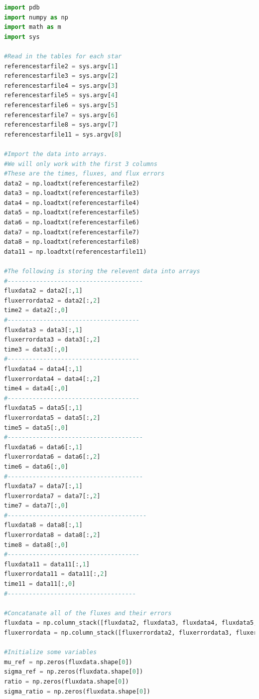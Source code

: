 \documentclass{aastex61}
\begin{document}
\begin{lstlisting}[language = Python, caption = Creates table of values to be used for the final light curve (YM and JM)]
import pdb
import numpy as np
import math as m
import sys

#Read in the tables for each star
referencestarfile2 = sys.argv[1]
referencestarfile3 = sys.argv[2]
referencestarfile4 = sys.argv[3]
referencestarfile5 = sys.argv[4]
referencestarfile6 = sys.argv[5]
referencestarfile7 = sys.argv[6]
referencestarfile8 = sys.argv[7]
referencestarfile11 = sys.argv[8]

#Import the data into arrays.
#We will only work with the first 3 columns
#These are the times, fluxes, and flux errors
data2 = np.loadtxt(referencestarfile2)
data3 = np.loadtxt(referencestarfile3)
data4 = np.loadtxt(referencestarfile4)
data5 = np.loadtxt(referencestarfile5)
data6 = np.loadtxt(referencestarfile6)
data7 = np.loadtxt(referencestarfile7)
data8 = np.loadtxt(referencestarfile8)
data11 = np.loadtxt(referencestarfile11)

#The following is storing the relevent data into arrays
#--------------------------------------
fluxdata2 = data2[:,1]
fluxerrordata2 = data2[:,2]
time2 = data2[:,0]
#-------------------------------------
fluxdata3 = data3[:,1]
fluxerrordata3 = data3[:,2]
time3 = data3[:,0]
#-------------------------------------
fluxdata4 = data4[:,1]
fluxerrordata4 = data4[:,2]
time4 = data4[:,0]
#-------------------------------------
fluxdata5 = data5[:,1]
fluxerrordata5 = data5[:,2]
time5 = data5[:,0]
#--------------------------------------
fluxdata6 = data6[:,1]
fluxerrordata6 = data6[:,2]
time6 = data6[:,0]
#--------------------------------------
fluxdata7 = data7[:,1]
fluxerrordata7 = data7[:,2]
time7 = data7[:,0]
#---------------------------------------
fluxdata8 = data8[:,1]
fluxerrordata8 = data8[:,2]
time8 = data8[:,0]
#-------------------------------------
fluxdata11 = data11[:,1]
fluxerrordata11 = data11[:,2]
time11 = data11[:,0]
#------------------------------------

#Concatanate all of the fluxes and their errors
fluxdata = np.column_stack([fluxdata2, fluxdata3, fluxdata4, fluxdata5, fluxdata6, fluxdata7, fluxdata8])
fluxerrordata = np.column_stack([fluxerrordata2, fluxerrordata3, fluxerrordata4, fluxerrordata5, fluxerrordata6, fluxerrordata7, fluxerrordata8])

#Initialize some variables
mu_ref = np.zeros(fluxdata.shape[0])
sigma_ref = np.zeros(fluxdata.shape[0])
ratio = np.zeros(fluxdata.shape[0])
sigma_ratio = np.zeros(fluxdata.shape[0])


\end{lstlisting}
\end{document}
